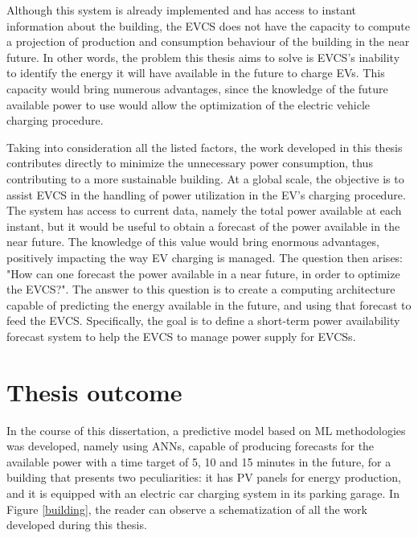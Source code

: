 Although this system is already implemented and has access to instant information about the building, the \ac{EVCS} does not have the capacity to compute a projection of production and consumption behaviour of the building in the near future. In other words, the problem this thesis aims to solve is \ac{EVCS}'s inability to identify the energy it will have available in the future to charge \ac{EV}s. This capacity would bring numerous advantages, since the knowledge of the future available power to use would allow the optimization of the electric vehicle charging procedure.


Taking into consideration all the listed factors, the work developed in this thesis contributes directly to minimize the unnecessary power consumption, thus contributing to a more sustainable building. At a global scale, the objective is to assist \ac{EVCS} in the handling of power utilization in the  \ac{EV}'s charging procedure. The system has access to current data, namely the total power available at each instant, but it would be useful to obtain a forecast of the power available in the near future. The knowledge of this value would bring enormous advantages, positively impacting the way \ac{EV} charging is managed. The question then arises: "How can one forecast the power available in a near future, in order to optimize the \ac{EVCS}?". The answer to this question is to create a computing architecture capable of predicting the energy available in the future, and using that forecast to feed the \ac{EVCS}. Specifically, the goal is to define a short-term power availability forecast system to help the \ac{EVCS} to manage power supply for \ac{EVCSs}. 





\section{Thesis outcome}

In the course of this dissertation, a predictive model based on \ac{ML} methodologies was developed, namely using \ac{ANNs}, capable of producing forecasts for the available power with a time target of 5, 10 and 15 minutes in the future, for a building that presents two peculiarities: it has \ac{PV} panels for energy production, and it is equipped with an electric car charging system in its parking garage. In Figure \ref{building}, the reader can observe a schematization of all the work developed during this thesis. 

